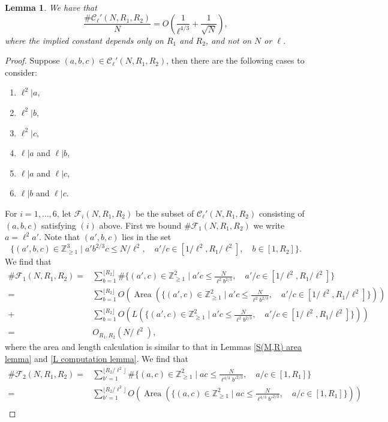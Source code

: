 \documentclass[table]{amsart}
\newtheorem{lemma}[theorem]{Lemma}
\newcommand{\cF}{\mathcal{F}}
\newcommand{\Z}{\mathbb{Z}}
\newcommand{\cC}{\mathcal{C}}
\newcommand{\op}[1]{\operatorname{#1}}
\numberwithin{equation}{section}
\begin{document}
\begin{lemma}\label{lemma 4.1}
    We have that 
    \[\frac{\# \cC_\ell'(N, R_1, R_2)}{N}=O\left(\frac{1}{\ell^{4/3}}+\frac{1}{\sqrt{N}}\right),\] where the implied constant depends only on $R_1$ and $R_2$, and not on $N$ or $\ell$.
\end{lemma}
\begin{proof}
Suppose $(a,b,c)\in \cC_\ell'(N, R_1, R_2)$, then there are the following cases to consider: 
\begin{enumerate}
    \item $\ell^2|a$, 
    \item $\ell^2|b$, 
    \item $\ell^2|c$, 
    \item
    $\ell|a$ and $\ell|b$, 
    \item $\ell|a$ and $\ell|c$, 
    \item $\ell|b$ and $\ell|c$.
\end{enumerate}
For $i=1, \dots, 6$, let $\cF_i(N, R_1, R_2)$ be the subset of $\cC_\ell'(N, R_1, R_2)$ consisting of $(a,b,c)$ satisfying $(i)$ above. First we bound $\#\cF_1(N, R_1, R_2)$ we write $a=\ell^2 a'$. Note that $(a',b,c)$ lies in the set 
\[\{(a',b,c)\in \Z_{\geq 1}^3\mid a'b^{2/3}c\leq N/\ell^2,\quad a'/c\in [1/\ell^2, R_1/\ell^2],\quad b\in [1, R_2]\}.\]
We find that
\[\begin{split}\# \cF_1(N, R_1, R_2)=& \sum_{b=1}^{\lfloor R_2\rfloor} \# \{(a',c)\in \Z_{\geq 1}^2\mid a'c\leq \frac{N}{\ell^2b^{2/3}},\quad a'/c\in [1/\ell^2, R_1/\ell^2]\}\\
=& \sum_{b=1}^{\lfloor R_2\rfloor} O\left( \op{Area}\left(\{(a',c)\in \Z_{\geq 1}^2\mid a'c\leq \frac{N}{\ell^2b^{2/3}},\quad a'/c\in [1/\ell^2, R_1/\ell^2]\}\right)\right)\\
+ & \sum_{b=1}^{\lfloor R_2\rfloor} O\left( L\left(\{(a',c)\in \Z_{\geq 1}^2\mid a'c\leq \frac{N}{\ell^2b^{2/3}},\quad a'/c\in [1/\ell^2, R_1/\ell^2]\}\right)\right)\\
=& O_{R_1, R_2}(N/\ell^2),
\end{split}\]
where the area and length calculation is similar to that in Lemmas \ref{S(M,R) area lemma} and \ref{L computation lemma}.
We find that 
\[\begin{split}\# \cF_2(N, R_1, R_2)=& \sum_{b'=1}^{\lfloor R_2/\ell^2\rfloor} \# \{(a,c)\in \Z_{\geq 1}^2\mid ac\leq \frac{N}{\ell^{4/3}b'^{2/3}},\quad a/c\in [1, R_1]\}\\
=& \sum_{b'=1}^{\lfloor R_2/\ell^2\rfloor} O\left( \op{Area}\left(\{(a,c)\in \Z_{\geq 1}^2\mid ac\leq \frac{N}{\ell^{4/3}b'^{2/3}},\quad a/c\in [1, R_1]\}\right)\right)\\

\end{split}\]
\end{proof}
\end{document}
